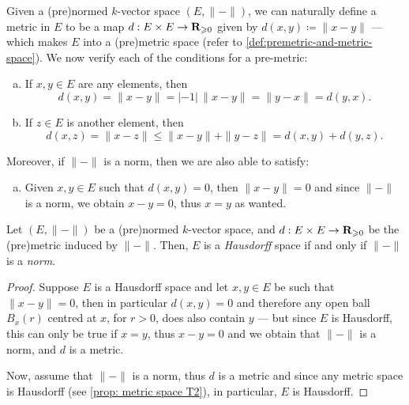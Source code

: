 \begin{example}
\label{exp:metric-from-norm}
Given a (pre)normed \(k\)-vector space \((E, \| - \|)\), we can naturally
define a metric in \(E\) to be a map \(d: E \times E \to \mathbf{R}_{\geqslant 0}\) given by
\(d(x, y) \coloneq \| x - y \|\) --- which makes \(E\) into a (pre)metric
space (refer to \cref{def:premetric-and-metric-space}). We now verify each of
the conditions for a pre-metric:
\begin{enumerate}[(a)]\setlength\itemsep{0em}
\item If \(x, y \in E\) are any elements, then
\[
  d(x, y) = \| x - y \| = |-1|\, \| x - y \| = \| y - x \| = d(y, x).
\]
\item If \(z \in E\) is another element, then
\[
  d(x, z) = \| x - z \| \leq \| x - y \| + \| y - z \| = d(x, y) + d(y, z).
\]
\end{enumerate}
Moreover, if \(\| - \|\) is a norm, then we are also able to satisfy:
\begin{enumerate}[(a)]\setlength\itemsep{0em}\setcounter{enumi}{2}
\item Given \(x, y \in E\) such that \(d(x, y) = 0\), then \(\| x - y \| = 0\)
and since \(\| - \|\) is a norm, we obtain \(x - y = 0\), thus \(x = y\) as
wanted.
\end{enumerate}
\end{example}

\begin{proposition}
\label{prop:hausdorff-space-norm}
Let \((E, \| - \|)\) be a (pre)normed \(k\)-vector space, and \(d: E \times E
\to \mathbf{R}_{\geqslant 0}\) be the (pre)metric induced by \(\| - \|\). Then, \(E\) is a
\emph{Hausdorff} space if and only if \(\| - \|\) is a \emph{norm}.
\end{proposition}

\begin{proof}
Suppose \(E\) is a Hausdorff space and let \(x, y \in E\) be such that \(\| x -
y \| = 0\), then in particular \(d(x, y) = 0\) and therefore any open ball
\(B_x(r)\) centred at \(x\), for \(r > 0\), does also contain \(y\) --- but
since \(E\) is Hausdorff, this can only be true if \(x = y\), thus \(x - y = 0\)
and we obtain that \(\| - \|\) is a norm, and \(d\) is a metric.

Now, assume that \(\| - \|\) is a norm, thus \(d\) is a metric and since any
metric space is Hausdorff (see \cref{prop: metric space T2}), in particular,
\(E\) is Hausdorff.
\end{proof}

